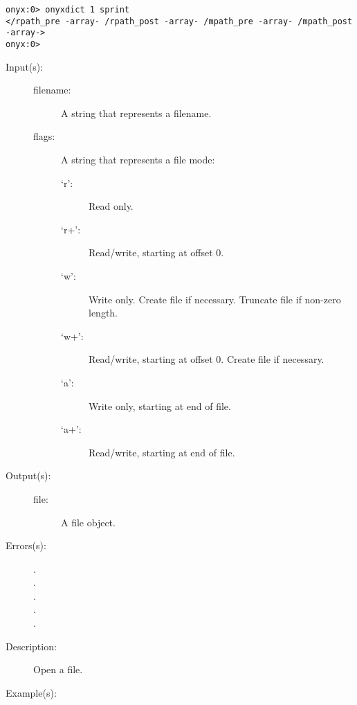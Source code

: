 \begin{description}
\begin{description}
\begin{verbatim}
onyx:0> onyxdict 1 sprint
</rpath_pre -array- /rpath_post -array- /mpath_pre -array- /mpath_post -array->
onyx:0>
		\end{verbatim}
	\end{description}
\label{systemdict:open}
\item[{\onyxop{filename flags}{open}{file}}: ]
	\begin{description}\item[]
	\item[Input(s): ]
		\begin{description}\item[]
		\item[filename: ]
			A string that represents a filename.
		\item[flags: ]
			A string that represents a file mode:
			\begin{description}\item[]
			\item[`r': ]
				Read only.
			\item[`r+': ]
				Read/write, starting at offset 0.
			\item[`w': ]
				Write only.  Create file if necessary.  Truncate
				file if non-zero length.
			\item[`w+': ]
				Read/write, starting at offset 0.  Create
				file if necessary.
			\item[`a': ]
				Write only, starting at end of file.
			\item[`a+': ]
				Read/write, starting at end of file.
			\end{description}
		\end{description}
	\item[Output(s): ]
		\begin{description}\item[]
		\item[file: ]
			A file object.
		\end{description}
	\item[Errors(s): ]
		\begin{description}\item[]
		\item[.]
		\item[.]
		\item[.]
		\item[.]
		\item[.]
		\end{description}
	\item[Description: ]
		Open a file.
	\item[Example(s): ]\begin{verbatim}


\end{verbatim}
\end{description}
\end{description}
